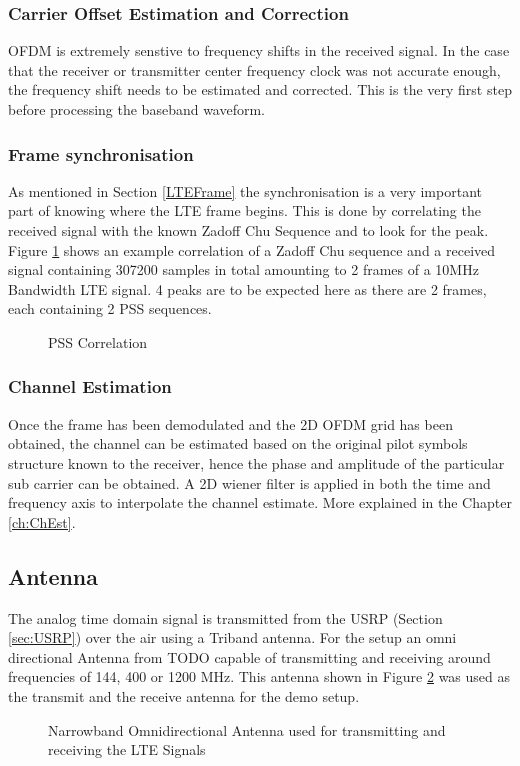 \subsubsection{Carrier Offset Estimation and Correction}
OFDM is extremely senstive to frequency shifts in the received signal. In the case that the receiver or transmitter center frequency clock was not accurate enough, the frequency shift needs to be estimated and corrected. This is the very first step before processing the baseband waveform.


\subsubsection{Frame synchronisation}
As mentioned in Section \ref{LTEFrame} the synchronisation is a very important part of knowing where the LTE frame begins. This is done by correlating the received signal with the known Zadoff Chu Sequence and to look for the peak. Figure \ref{fig:PSSCorr} shows an example correlation of a Zadoff Chu sequence and a received signal containing 307200 samples in total amounting to 2 frames of a 10MHz Bandwidth LTE signal. 4 peaks are to be expected here as there are 2 frames, each containing 2 PSS sequences.

\begin{figure}[H]
    \begin{center}
        \caption{PSS Correlation}
        \label{fig:PSSCorr}
    \end{center}
\end{figure}

\subsubsection{Channel Estimation}

Once the frame has been demodulated and the 2D OFDM grid has been obtained, the channel can be estimated based on the original pilot symbols structure known to the receiver, hence the phase and amplitude of the particular sub carrier can be obtained. A 2D wiener filter is applied in both the time and frequency axis to interpolate the channel estimate. More explained in the Chapter \ref{ch:ChEst}.


\subsection{Antenna}
The analog time domain signal is transmitted from the USRP (Section \ref{sec:USRP}) over the air using a Triband antenna. For the setup an omni directional Antenna from TODO capable of transmitting and receiving around frequencies of 144, 400 or 1200 MHz. This antenna shown in Figure \ref{fig:USRPAnt} was used as the transmit and the receive antenna for the demo setup.

\begin{figure}[H]
    \begin{center}
        \caption{Narrowband Omnidirectional Antenna used for transmitting and receiving the LTE Signals}
        \label{fig:USRPAnt}
    \end{center}
\end{figure}
